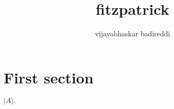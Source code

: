 \documentclass[12pt]{article}
\title{fitzpatrick}
\author{vijayabhaskar badireddi}
\begin{document}

\section*{First section}
$\displaystyle \vert A\rangle.$
\end{document}
